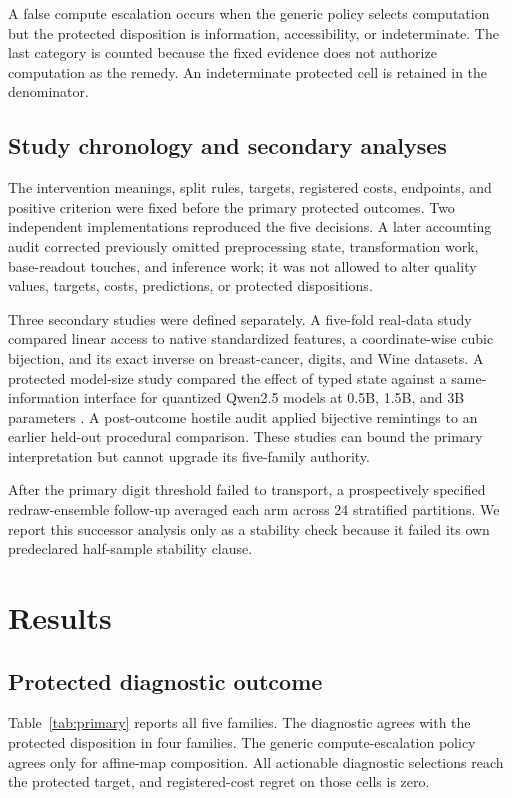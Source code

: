 \documentclass[10pt]{article}
\begin{document}
A false compute escalation occurs when the generic policy selects computation but the protected disposition is information, accessibility, or indeterminate. The last category is counted because the fixed evidence does not authorize computation as the remedy. An indeterminate protected cell is retained in the denominator.

\subsection{Study chronology and secondary analyses}

The intervention meanings, split rules, targets, registered costs, endpoints, and positive criterion were fixed before the primary protected outcomes. Two independent implementations reproduced the five decisions. A later accounting audit corrected previously omitted preprocessing state, transformation work, base-readout touches, and inference work; it was not allowed to alter quality values, targets, costs, predictions, or protected dispositions.

Three secondary studies were defined separately. A five-fold real-data study compared linear access to native standardized features, a coordinate-wise cubic bijection, and its exact inverse on breast-cancer, digits, and Wine datasets. A protected model-size study compared the effect of typed state against a same-information interface for quantized Qwen2.5 models at 0.5B, 1.5B, and 3B parameters \citep{qwen2025report}. A post-outcome hostile audit applied bijective remintings to an earlier held-out procedural comparison. These studies can bound the primary interpretation but cannot upgrade its five-family authority.

After the primary digit threshold failed to transport, a prospectively specified redraw-ensemble follow-up averaged each arm across 24 stratified partitions. We report this successor analysis only as a stability check because it failed its own predeclared half-sample stability clause.

\section{Results}

\subsection{Protected diagnostic outcome}

Table~\ref{tab:primary} reports all five families. The diagnostic agrees with the protected disposition in four families. The generic compute-escalation policy agrees only for affine-map composition. All actionable diagnostic selections reach the protected target, and registered-cost regret on those cells is zero.
\end{document}
